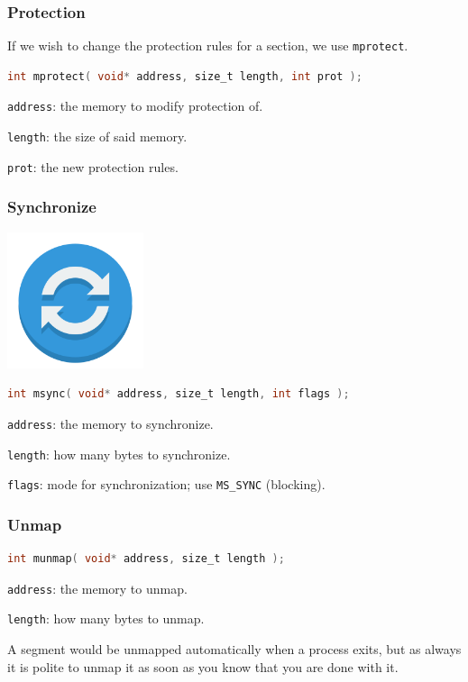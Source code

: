\begin{frame}[fragile]
	\frametitle{Protection}

	If we wish to change the protection rules for a section, we use \texttt{mprotect}.

	\begin{lstlisting}[language=C]
int mprotect( void* address, size_t length, int prot );
\end{lstlisting}

	\texttt{address}: the memory to modify protection of.

	\texttt{length}: the size of said memory.

	\texttt{prot}: the new protection rules.

\end{frame}


\begin{frame}[fragile]
	\frametitle{Synchronize}

	\begin{center}
		\includegraphics[width=0.3\textwidth]{images/sync-icon.png}
	\end{center}

	\begin{lstlisting}[language=C]
int msync( void* address, size_t length, int flags );
\end{lstlisting}

	\texttt{address}: the memory to synchronize.

	\texttt{length}: how many bytes to synchronize.

	\texttt{flags}: mode for synchronization; use \texttt{MS\_SYNC} (blocking).

\end{frame}


\begin{frame}[fragile]
	\frametitle{Unmap}

	\begin{lstlisting}[language=C]
int munmap( void* address, size_t length );
\end{lstlisting}

	\texttt{address}: the memory to unmap.

	\texttt{length}: how many bytes to unmap.

	A segment would be unmapped automatically when a process exits, but as always it is polite to unmap it as soon as you know that you are done with it.

\end{frame}


